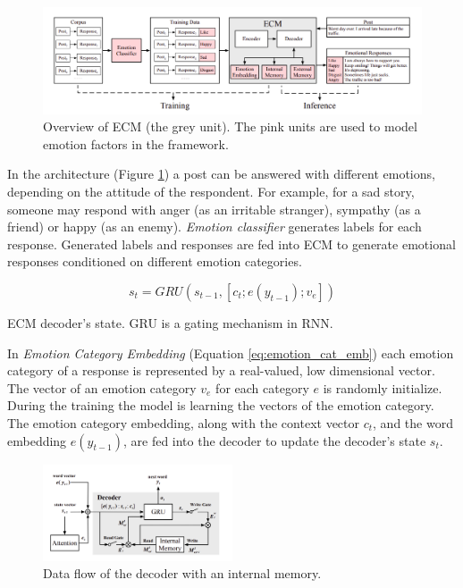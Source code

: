 \begin{figure}[hbt]
  \centering
  \includegraphics[width=1\textwidth]{figures/ecm.png}
  \caption{Overview of ECM (the grey unit). The pink units are used to model emotion factors in the framework.}
  \label{fig:ecm}
\end{figure}

In the architecture (Figure \ref{fig:ecm}) a post can be answered with different emotions, depending on the attitude of the respondent. For example, for a sad story, someone may respond with anger  (as an irritable stranger), sympathy (as a friend) or happy (as an enemy). \textit{Emotion classifier} generates labels for each response. Generated labels and responses are fed into ECM to generate emotional responses conditioned on different emotion categories. 

\begin{eqfloat}
\begin{equation} \label{eq:emotion_cat_emb}
s_t = GRU(s_{t-1},[c_t; e(y_{t-1}); v_e])
\end{equation}
\caption{ECM decoder's state. GRU \cite{cho2014learning} is a gating mechanism in RNN.}
\end{eqfloat}

In \textit{Emotion Category Embedding} (Equation \ref{eq:emotion_cat_emb}) each emotion category of a response is represented by a real-valued, low dimensional vector. The vector of an emotion category $v_e$ for each category $e$ is randomly initialize. During the training the model is learning the vectors of the emotion category. The emotion category embedding, along with the context vector $c_t$, and the word embedding $e(y_{t-1})$, are fed into the decoder to update the decoder's state $s_t$. 

\begin{figure}[H]
  \centering
  \includegraphics[width=0.5\textwidth]{figures/internal_memory.png}
  \caption{Data flow of the decoder with an internal memory.}
  \label{fig:internal_memory}
\end{figure}

